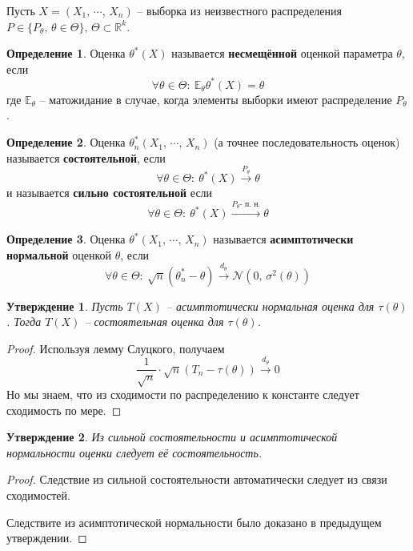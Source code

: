 \documentclass[a4paper,12pt]{article}
\theoremstyle{plain}
\newtheorem{proposition}{Утверждение}[section]
\theoremstyle{definition}
\newtheorem{definition}{Определение}[section]
\theoremstyle{remark}
\begin{document}
Пусть $X = (X_1,\,\cdots,\,X_n)$ -- выборка из неизвестного распределения $P \in \{P_\theta,\, \theta \in \Theta\},\, \Theta \subset \mathbb{R}^k$.

\begin{definition}
  Оценка $\theta^*(X)$ называется \textbf{несмещённой} оценкой параметра $\theta$, если
  \[
    \forall \theta \in \Theta :\: \mathbb{E}_\theta\theta^*(X) = \theta
  \]
  где $\mathbb{E}_\theta$ -- матожидание в случае, когда элементы выборки имеют распределение $P_\theta$.
\end{definition}

\begin{definition}
  Оценка $\theta_n^*(X_1,\,\cdots,\,X_n)$ (а точнее последовательность оценок) называется \textbf{состоятельной}, если
  \[
    \forall \theta \in \Theta :\: \theta^*(X) \overset{P_\theta}{\to} \theta
  \]
  и называется \textbf{сильно состоятельной} если
  \[
    \forall \theta \in \Theta :\: \theta^*(X) \overset{P_\theta\text{- п. н.}}{\to} \theta
  \]
\end{definition}

\begin{definition}
  Оценка $\theta^*(X_1,\,\cdots,\,X_n)$ называется \textbf{асимптотически нормальной} оценкой $\theta$, если 
  \[
    \forall \theta \in \Theta :\: \sqrt{n}(\theta_n^* - \theta) \overset{d_\theta}{\to} \mathcal{N}(0,\, \sigma^2(\theta))
  \]
\end{definition}

\begin{proposition}
  Пусть $T(X)$ -- асимптотически нормальная оценка для $\tau(\theta)$. Тогда $T(X)$ -- состоятельная оценка для $\tau(\theta)$.
\end{proposition}

\begin{proof}
  Используя лемму Слуцкого, получаем
  \[
    \frac{1}{\sqrt{n}}\cdot\sqrt{n}(T_n - \tau(\theta)) \overset{d_\theta}{\to} 0 
  \]
  Но мы знаем, что из сходимости по распределению к константе следует сходимость по мере.
\end{proof}

\begin{proposition}
  Из сильной состоятельности и асимптотической нормальности оценки следует её состоятельность.
\end{proposition}

\begin{proof}
  Следствие из сильной состоятельности автоматически следует из связи сходимостей.

  Следствите из асимптотической нормальности было доказано в предыдущем утверждении.
\end{proof}
\end{document}
